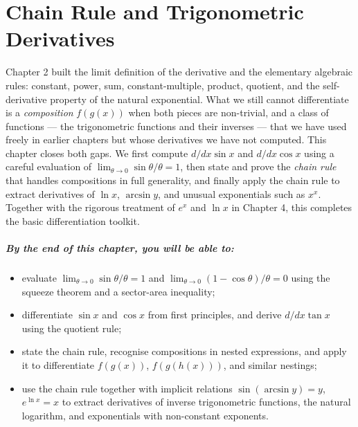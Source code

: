 \chapter{Chain Rule and Trigonometric Derivatives}

Chapter 2 built the limit definition of the derivative and the elementary algebraic rules: constant, power, sum, constant-multiple, product, quotient, and the self-derivative property of the natural exponential. What we still cannot differentiate is a \emph{composition} \(f(g(x))\) when both pieces are non-trivial, and a class of functions --- the trigonometric functions and their inverses --- that we have used freely in earlier chapters but whose derivatives we have not computed. This chapter closes both gaps. We first compute \(d/dx \sin x\) and \(d/dx \cos x\) using a careful evaluation of \(\lim_{\theta \to 0} \sin \theta / \theta = 1\), then state and prove the \emph{chain rule} that handles compositions in full generality, and finally apply the chain rule to extract derivatives of \(\ln x\), \(\arcsin y\), and unusual exponentials such as \(x^{x}\). Together with the rigorous treatment of \(e^{x}\) and \(\ln x\) in Chapter 4, this completes the basic differentiation toolkit.

\paragraph{By the end of this chapter, you will be able to:}
\begin{itemize}
    \item evaluate \(\displaystyle \lim_{\theta \to 0} \sin \theta / \theta = 1\) and \(\displaystyle \lim_{\theta \to 0} (1 - \cos \theta) / \theta = 0\) using the squeeze theorem and a sector-area inequality;
    \item differentiate \(\sin x\) and \(\cos x\) from first principles, and derive \(d/dx \tan x\) using the quotient rule;
    \item state the chain rule, recognise compositions in nested expressions, and apply it to differentiate \(f(g(x))\), \(f(g(h(x)))\), and similar nestings;
    \item use the chain rule together with implicit relations \(\sin(\arcsin y) = y\), \(e^{\ln x} = x\) to extract derivatives of inverse trigonometric functions, the natural logarithm, and exponentials with non-constant exponents.
\end{itemize}

